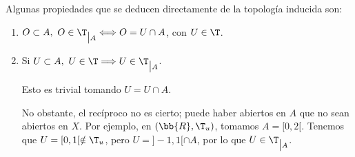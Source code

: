 Algunas propiedades que se deducen directamente de la topología inducida son:
\begin{enumerate}
    \item $O\subset A,~O\in \T_{\big| A}\Longleftrightarrow O=U\cap A$, con $U\in \T$.

    \item Si $U\subset A,~U\in \T\Longrightarrow U\in \T_{\big| A}$.

    Esto es trivial tomando $U=U\cap A$.

    No obstante, el recíproco no es cierto; puede haber abiertos en $A$ que no sean abiertos en $X$. Por ejemplo, en $(\bb{R},\T_u)$, tomamos $A=[0,2[$. Tenemos que $U=[0,1[\notin \T_u$, pero $U=]-1,1[\cap A$, por lo que $U\in \T_{\big| A}$.
\end{enumerate}

